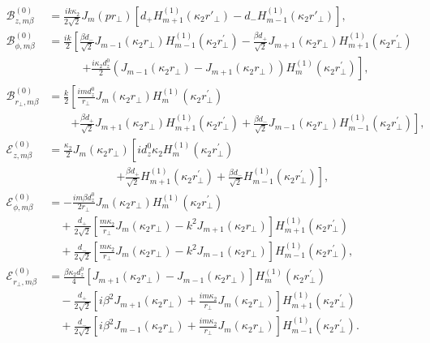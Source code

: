 \documentclass[preprint,aps,pra,onecolumn]{revtex4-1} %
\begin{document}
\begin{align}
\mathcal{B}_{z,m\beta}^{(0)} &= \frac{ik\kappa_2}{2\sqrt{2}}J_m(pr\!_\perp)\left[ d_{+} H_{m+1}^{(1)}(\kappa_2r'\!\!_\perp) \!-\! d_- H_{m-1}^{(1)}(\kappa_2r'\!_\perp) \right],\\
\mathcal{B}_{\phi,m\beta}^{(0)} &= \frac{ik}{2}\left[ \frac{\beta d_{-}}{\sqrt{2}} J_{m-1}\left( \kappa_2r\!_\perp \right)H_{m-1}^{(1)}\left( {\kappa_2r\!_\perp^{\prime} }\right) -\frac{\beta d_+}{\sqrt{2}} J_{m+1}\left( \kappa_2r\!_\perp \right)H_{m+1}^{(1)}\left( {\kappa_2r\!_\perp^{\prime} }\right)\right. \nonumber\\ 
&\qquad\quad \left. + \frac{i\kappa_2d^0_z}{2}\left(J_{m-1}(\kappa_2r\!_\perp)-J_{m+1}(\kappa_2r\!_\perp) \right)H_m^{(1)}(\kappa_2r\!_\perp^{\prime}) \right],\\
\mathcal{B}_{r\!_\perp, m\beta}^{(0)} &= \frac{k}{2}\left[\frac{i m d^0_z}{r\!_\perp} J_m\left( \kappa_2r\!_\perp \right) H_m^{(1)}\left( {\kappa_2r\!_\perp^{\prime} }\right) \right. \nonumber\\
&\qquad \left. +\frac{\beta d_+}{\sqrt{2}} J_{m\!+\!1}(\kappa_2r\!_\perp) H_{m\!+\! 1}^{(1)}(\kappa_2r\!_\perp^{\prime}) \!+\! \frac{\beta d_-}{\sqrt{2}} J_{m\!-\! 1}(\kappa_2r\!_\perp)H_{m\!-\!1}^{(1)}(\kappa_2r\!_\perp^{\prime})   \right],\\
\mathcal{E}_{z,m\beta}^{(0)} 
&= \frac{\kappa_2}{2}J_{m}\left( \kappa_2r\!_\perp \right)\left[  id^0_z \kappa_2 H_m^{(1)}\left( {\kappa_2r\!_\perp^{\prime} }\right) \phantom{\frac{d^0_z}{\sqrt{2}}} \right. \nonumber\\
&\qquad\qquad\qquad \left. + \frac{\beta d_{+}}{\sqrt{2}} H_{m+1}^{(1)}\left( {\kappa_2r\!_\perp^{\prime} }\right) +\frac{\beta d_-}{\sqrt{2}} H_{m-1}^{(1)}\left( {\kappa_2r\!_\perp^{\prime} }\right) \right], \\
\mathcal{E}_{\phi,m\beta}^{(0)} 
&= -\frac{im\beta d^0_z}{2r\!_\perp} J_{m}\left( \kappa_2r\!_\perp \right) H_m^{(1)}\left( {\kappa_2r\!_\perp^{\prime} }\right) \nonumber\\
&\quad+\frac{d_+}{2\sqrt{2}} \left[ \frac{m\kappa_2}{r\!_\perp}J_{m}\left( \kappa_2r\!_\perp \right)-k^2 J_{m+1}\left( \kappa_2r\!_\perp \right)\right] H_{m+1}^{(1)}\left( {\kappa_2r\!_\perp^{\prime} }\right) \nonumber\\
&\quad+ \frac{d_-}{2\sqrt{2}}\left[\frac{m\kappa_2}{r\!_\perp}J_m\!\left( \kappa_2r_\perp \right)-k^2J_{m-1}\!\left( \kappa_2r_\perp \right) \right] H_{m-1}^{(1)}\!\left( {\kappa_2r\!_\perp^{\prime} }\right),\\
\mathcal{E}_{r\!_\perp,m\beta}^{(0)} 
&= \frac{\beta \kappa_2d^0_z}{4}\left[ J_{m+1}\!\left( \kappa_2r\!_\perp \right)-J_{m-1}\!\left( \kappa_2r_\perp \right)\right] H_m^{(1)}\left( {\kappa_2r\!_\perp^{\prime} }\right)\nonumber\\ 
&\quad -\frac{d_+}{2\sqrt{2}}\left[ i\beta^2J_{m+1}\!\left( \kappa_2r_\perp \right) +\frac{im\kappa_2}{r\!_\perp}J_m\!\left( \kappa_2r_\perp \right)\right] H_{m+1}^{(1)}\!\left( {\kappa_2r\!_\perp^{\prime} }\right)\nonumber\\
&\quad + \frac{d_-}{2\sqrt{2}}\left[ i\beta^2J_{m-1}\!\left( \kappa_2r_\perp \right) +\frac{im\kappa_2}{r\!_\perp}J_m\!\left( \kappa_2r_\perp \right)\right] H_{m-1}^{(1)}\!\left( {\kappa_2r\!_\perp^{\prime} }\right).
\end{align}
\end{document}
